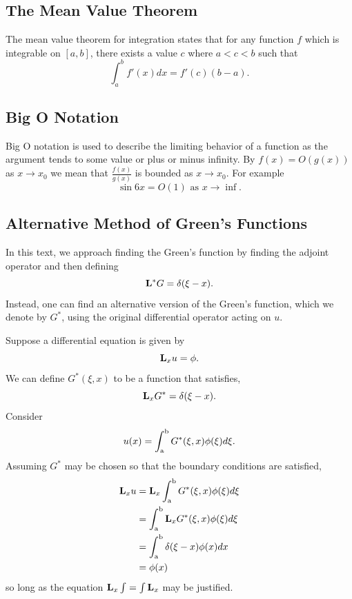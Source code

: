 \subsection{The Mean Value Theorem}
    The mean value theorem for integration states that for any function \(f\) which is integrable on \([a,b]\), there exists a value \(c\) where \(a < c < b\) such that
    \begin{equation*}
        \int_{a}^{b} f'(x)dx = f'(c)(b-a).
    \end{equation*}
\subsection{Big O Notation} \label{sec:BigO}
Big O notation is used to describe the limiting behavior of a function as the argument tends to some value or plus or minus infinity. By \(f(x)=O(g(x))\) as \(x\to x_0\) we mean that \(\frac{f(x)}{g(x)}\) is bounded as \(x\to x_0\). For example 
\begin{equation*}
    \sin 6x = O(1) \text{ as } x\to \inf.
\end{equation*}

\subsection{Alternative Method of Green's Functions}
In this text, we approach finding the Green's function by finding the adjoint operator and then defining 
\begin{equation*}
    \mathrm{\bf{L^*}} G = \delta(\xi-x).
\end{equation*}
Instead, one can find an alternative version of the Green's function, which we denote by \(G^*\), using the original differential operator acting on \(u\). 

Suppose a differential equation is given by
\begin{equation*}
    \mathrm{\bf{L}}_x u = \phi.
\end{equation*}
We can define \(G^*(\xi,x)\) to be a function that satisfies,
\begin{equation*}
    \mathrm{\bf{L}}_x G^* = \delta(\xi-x).
\end{equation*}
Consider
\begin{equation*}
    u(x) = \int_\mathrm{a}^\mathrm{b} G^*(\xi,x)\phi(\xi)d\xi.
\end{equation*}
Assuming \(G^*\) may be chosen so that the boundary conditions are satisfied,
\begin{equation*}
    \begin{split}
        \mathrm{\bf{L}}_x u &= \mathrm{\bf{L}}_x \int_\mathrm{a}^\mathrm{b} G^*(\xi,x)\phi(\xi)d\xi\\ 
        &= \int_\mathrm{a}^\mathrm{b} \mathrm{\bf{L}}_xG^*(\xi,x)\phi(\xi)d\xi  \\ 
        &= \int_\mathrm{a}^\mathrm{b} \delta(\xi-x)\phi(x)dx\\  
        &= \phi(x)
    \end{split}
\end{equation*}
so long as the equation \(\mathrm{\bf{L}}_x\int = \int \mathrm{\bf{L}}_x\) may be justified.
